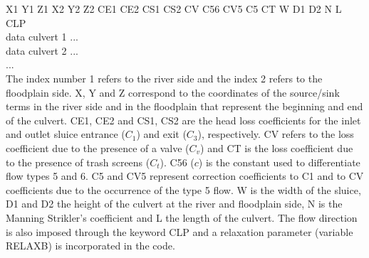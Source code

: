 X1  Y1  Z1  X2  Y2  Z2  CE1  CE2  CS1  CS2  CV  C56  CV5  C5 CT  W  D1  D2 N  L CLP\\
data culvert 1  ...\\
data culvert 2 ...\\
... \\

The index number 1 refers to the river side and the index 2 refers to the floodplain side. 
X, Y and Z correspond to the coordinates of the source/sink terms in the river side 
and in the floodplain that represent the beginning and end of the culvert. 
CE1, CE2 and CS1, CS2 are the head loss coefficients 
for the inlet and outlet sluice entrance ($C_1$)  and exit ($C_3$), respectively. 
CV refers to the loss coefficient due to the presence of a valve ($C_v$) and 
CT is the loss coefficient due to the presence of trash screens ($C_t$). 
C56 ($c$) is the constant used to differentiate flow types 5 and 6. 
C5 and CV5 represent correction coefficients to C1 and to CV coefficients 
due to the occurrence of the type 5 flow. 
W is the width of the sluice, D1 and D2 the height of the culvert at the river and 
floodplain side, N is the Manning Strikler’s coefficient and L the length of the culvert. 
The flow direction is also imposed through the keyword CLP and 
a relaxation parameter (variable RELAXB) is incorporated in the code.




